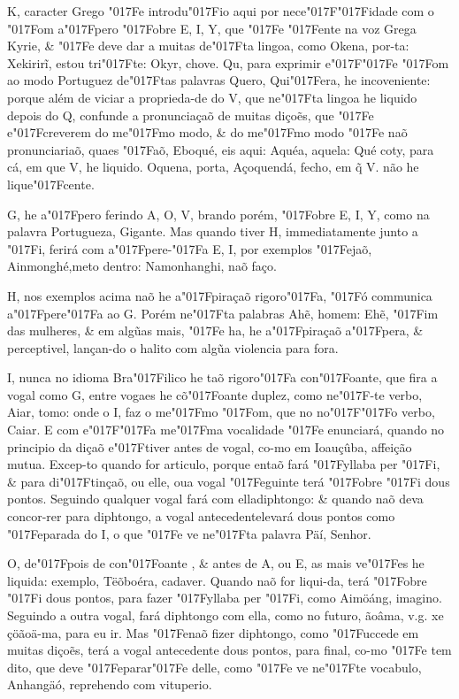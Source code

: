 \documentclass[openany,titlepage,12pt]{book}
\newcommand{\lgS}{\char"017F}
\newcommand{\lgSS}{\char"017F\char"017F}
\begin{document}
K, caracter Grego \lgS e introdu\lgS io aqui por
nece\lgSS idade com o \lgS om a\lgS pero \lgS obre E, I, Y, que
\lgS e \lgS ente na voz Grega Kyrie, \& \lgS e deve dar a muitas
de\lgS ta lingoa, como Okena, por-ta: Xekirirĩ, estou tri\lgS te:
Okyr, chove. Qu, para exprimir e\lgSS e \lgS om ao modo Portuguez
de\lgS tas palavras Quero, Qui\lgS era, he incoveniente: porque 
além de viciar a proprieda-de do V, que ne\lgS ta lingoa he liquido
depois do Q, confunde a pronunciaçaõ de muitas diçoẽs, que \lgS e
e\lgS creverem do me\lgS mo modo, \& do me\lgS mo modo \lgS e naõ
pronunciariaõ, quaes \lgS aõ, Eboqué, eis aqui: Aquéa, aquela: 
Qué coty, para cá, em que V, he liquido. Oquena, porta, Açoquendá,
fecho, em \~{q} V. não he lique\lgS cente.

G, he a\lgS pero ferindo A, O, V, brando porém, \lgS obre E, I, Y,
como na palavra Portugueza, Gigante. Mas quando tiver H,
immediatamente junto a \lgS i, ferirá com a\lgS pere-\lgS a
E, I, por exemplos \lgS ejaõ, Ainmonghé,\linebreak meto dentro:
Namonhanghi, naõ faço.

H, nos exemplos acima naõ he a\lgS piraçaõ rigoro\lgS a, \lgS ó
communica a\lgS pere\lgS a ao G. Porém ne\lgS ta palabras Ahẽ,
homem: Ehẽ, \lgS im das mulheres, \& em algũas mais, \lgS e ha,
he a\lgS piraçaõ a\lgS pera, \& perceptivel, lançan-do o halito
com algũa violencia para fora.

I, nunca no idioma Bra\lgS ilico he taõ rigoro\lgS a con\lgS oante,
que fira a vogal como G, entre vogaes he cõ\lgS oante duplez, como
ne\lgS -te verbo, Aiar, tomo: onde o I, faz o me\lgS mo \lgS om,
que no no\lgSS o verbo, Caiar. E com e\lgSS a me\lgS ma vocalidade 
\lgS e enunciará, quando no principio da diçaõ e\lgS tiver antes de
vogal, co-mo em Ioauçûba, affeição mutua. Excep-to quando for
articulo, porque entaõ fará \lgS yllaba per \lgS i, \& para
di\lgS tinçaõ, ou elle, ou\linebreak a vogal \lgS eguinte terá
\lgS obre \lgS i dous pontos. Seguindo qualquer vogal fará 
com ella\linebreak diphtongo: \& quando naõ deva concor-rer
para diphtongo, a vogal antecedente\linebreak levará dous pontos
como \lgS eparada do I, o que \lgS e ve ne\lgS ta palavra
Päí, Senhor.

O, de\lgS pois de con\lgS oante , \& antes de A, ou E, as mais
ve\lgS es he liquida: exemplo, Tëõboéra, cadaver. Quando naõ for
liqui-da, terá \lgS obre \lgS i dous pontos, para fazer \lgS yllaba
per \lgS i, como Aimöáng, imagino. Seguindo a outra vogal, fará 
diphtongo com ella, como no futuro, ãoâma, v.g. xe çöãoä-ma, para
eu ir. Mas \lgS enaõ fizer diphtongo, como \lgS uccede em muitas
diçoẽs, terá a vogal antecedente dous pontos, para final, co-mo
\lgS e tem dito, que deve \lgS eparar\lgS e delle, como \lgS e ve
ne\lgS te vocabulo, Anhangäó, reprehendo com vituperio.
\end{document}
